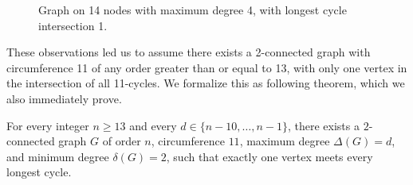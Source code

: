 \begin{figure}
  \centering
  \caption{Graph on 14 nodes with maximum degree 4, with longest cycle intersection 1.}
  \label{fig:d4n14i1}
\end{figure}

These observations led us to assume there exists a 2-connected graph with circumference 11 of any order greater than or equal to 13, with only one vertex in the intersection of all 11-cycles. We formalize this as following theorem, which we also immediately prove.

\begin{theorem}
\label{theorem:single-vertex-intersection}
For every integer $n \ge 13$ and every $d \in\{n-10,\ldots,n-1\}$, there exists a $2$-connected graph $G$ of order $n$, circumference $11$, maximum degree $\Delta(G) = d$, and minimum degree $\delta(G) = 2$, such that exactly one vertex meets every longest cycle.
\end{theorem}

